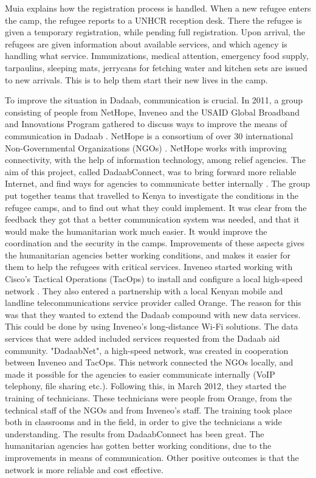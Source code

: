 Muia explains how the registration process is handled. When a new refugee enters the camp, the refugee reports to a UNHCR reception desk. There the refugee is given a temporary registration, while pending full registration. Upon arrival, the refugees are given information about available services, and which agency is handling what service. Immunizations, medical attention, emergency food supply, tarpaulins, sleeping mats, jerrycans for fetching water and kitchen sets are issued to new arrivals. This is to help them start their new lives in the camp. 

To improve the situation in Dadaab, communication is crucial. In 2011, a group consisting of people from NetHope, Inveneo and the USAID Global Broadband and Innovations Program gathered to discuss ways to improve the means of communication in Dadaab \cite{dadaab}. NetHope is a consortium of over 30 international Non-Governmental Organizations (NGOs) \cite{nethope}. NetHope works with improving connectivity, with the help of information technology, among relief agencies. The aim of this project, called DadaabConnect, was to bring forward more reliable Internet, and find ways for agencies to communicate better internally \cite{dadaab}. The group put together teams that travelled to Kenya to investigate the conditions in the refugee camps, and to find out what they could implement. It was clear from the feedback they got that a better communication system was needed, and that it would make the humanitarian work much easier. It would improve the coordination and the security in the camps. Improvements of these aspects gives the humanitarian agencies better working conditions, and makes it easier for them to help the refugees with critical services. Inveneo started working with Cisco's Tactical Operations (TacOps) to install and configure a local high-speed network \cite{dadaabinveneo}. They also entered a partnership with a local Kenyan mobile and landline telecommunications service provider called Orange. The reason for this was that they wanted to extend the Dadaab compound with new data services. This could be done by using Inveneo's long-distance Wi-Fi solutions. The data services that were added included services requested from the Dadaab aid community. "DadaabNet", a high-speed network, was created in cooperation between Inveneo and TacOps. This network connected the NGOs locally, and made it possible for the agencies to easier communicate internally (VoIP telephony, file sharing etc.). Following this, in March 2012, they started the training of technicians. These technicians were people from Orange, from the technical staff of the NGOs and from Inveneo's staff. The training took place both in classrooms and in the field, in order to give the technicians a wide understanding. The results from DadaabConnect has been great. The humanitarian agencies has gotten better working conditions, due to the improvements in means of communication. Other positive outcomes is that the network is more reliable and cost effective. 

